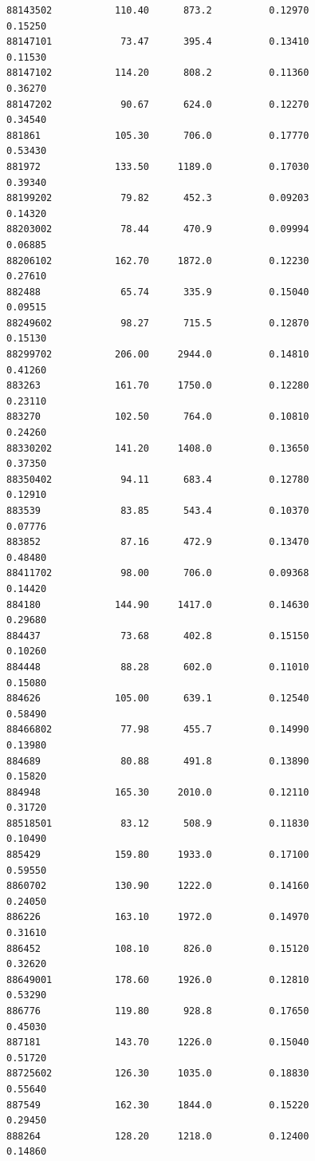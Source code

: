 \documentclass[
  letterpaper,
  DIV=11,
  numbers=noendperiod]{scrartcl}
\begin{document}
\begin{verbatim}
88143502           110.40      873.2          0.12970           0.15250
88147101            73.47      395.4          0.13410           0.11530
88147102           114.20      808.2          0.11360           0.36270
88147202            90.67      624.0          0.12270           0.34540
881861             105.30      706.0          0.17770           0.53430
881972             133.50     1189.0          0.17030           0.39340
88199202            79.82      452.3          0.09203           0.14320
88203002            78.44      470.9          0.09994           0.06885
88206102           162.70     1872.0          0.12230           0.27610
882488              65.74      335.9          0.15040           0.09515
88249602            98.27      715.5          0.12870           0.15130
88299702           206.00     2944.0          0.14810           0.41260
883263             161.70     1750.0          0.12280           0.23110
883270             102.50      764.0          0.10810           0.24260
88330202           141.20     1408.0          0.13650           0.37350
88350402            94.11      683.4          0.12780           0.12910
883539              83.85      543.4          0.10370           0.07776
883852              87.16      472.9          0.13470           0.48480
88411702            98.00      706.0          0.09368           0.14420
884180             144.90     1417.0          0.14630           0.29680
884437              73.68      402.8          0.15150           0.10260
884448              88.28      602.0          0.11010           0.15080
884626             105.00      639.1          0.12540           0.58490
88466802            77.98      455.7          0.14990           0.13980
884689              80.88      491.8          0.13890           0.15820
884948             165.30     2010.0          0.12110           0.31720
88518501            83.12      508.9          0.11830           0.10490
885429             159.80     1933.0          0.17100           0.59550
8860702            130.90     1222.0          0.14160           0.24050
886226             163.10     1972.0          0.14970           0.31610
886452             108.10      826.0          0.15120           0.32620
88649001           178.60     1926.0          0.12810           0.53290
886776             119.80      928.8          0.17650           0.45030
887181             143.70     1226.0          0.15040           0.51720
88725602           126.30     1035.0          0.18830           0.55640
887549             162.30     1844.0          0.15220           0.29450
888264             128.20     1218.0          0.12400           0.14860

\end{verbatim}
\end{document}
